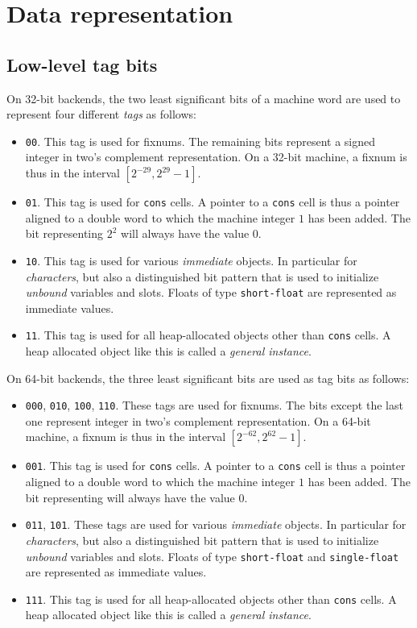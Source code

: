\chapter{Data representation}
\label{chap-data-representation}

\section{Low-level tag bits}

On 32-bit backends, the two least significant bits of a machine word
are used to represent four different \emph{tags} as follows:

\begin{itemize}
\item \texttt{00}.  This tag is used for fixnums.  The remaining bits
  represent a signed integer in two's complement representation.  On a
  32-bit machine, a fixnum is thus in the interval $[2^{-29}, 2^{29} -
    1]$.
\item \texttt{01}.  This tag is used for \texttt{cons} cells.  A
  pointer to a \texttt{cons} cell is thus a pointer aligned to a
  double word to which the machine integer $1$ has been added.  The
  bit representing $2^2$ will always have the value $0$.
\item \texttt{10}.  This tag is used for various \emph{immediate}
  objects.  In particular for \emph{characters}, but also a
  distinguished bit pattern that is used to initialize \emph{unbound}
  variables and slots.  Floats of type \texttt{short-float} are
  represented as immediate values. 
\item \texttt{11}.  This tag is used for all heap-allocated objects
  other than \texttt{cons} cells.  A heap allocated object like this
  is called a \emph{general instance}.
\end{itemize}

On 64-bit backends, the three least significant bits are used as tag
bits as follows:

\begin{itemize}
\item \texttt{000}, \texttt{010}, \texttt{100}, \texttt{110}.  These
  tags are used for fixnums.  The bits except the last one represent
  integer in two's complement representation.  On a 64-bit machine, a
  fixnum is thus in the interval $[2^{-62}, 2^{62} - 1]$.
\item \texttt{001}.  This tag is used for \texttt{cons} cells.  A
  pointer to a \texttt{cons} cell is thus a pointer aligned to a
  double word to which the machine integer $1$ has been added.  The
  bit representing will always have the value $0$.
\item \texttt{011}, \texttt{101}.  These tags are used for various
  \emph{immediate} objects.  In particular for \emph{characters}, but
  also a distinguished bit pattern that is used to initialize
  \emph{unbound} variables and slots.  Floats of type
  \texttt{short-float} and \texttt{single-float} are represented as
  immediate values.
\item \texttt{111}.  This tag is used for all heap-allocated objects
  other than \texttt{cons} cells.  A heap allocated object like this
  is called a \emph{general instance}.
\end{itemize}

